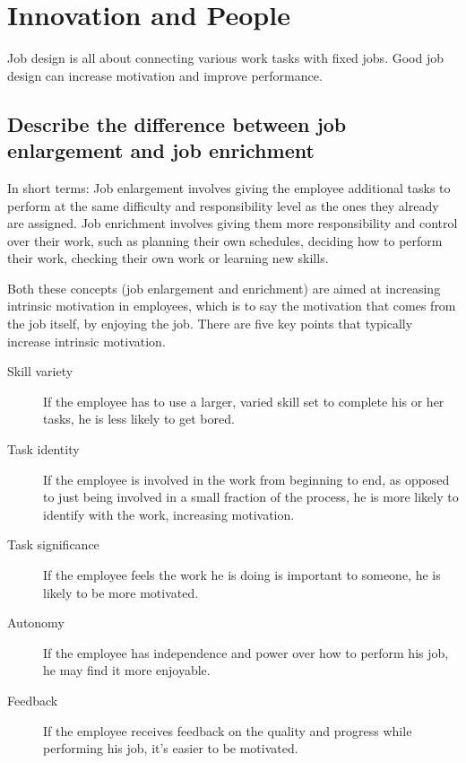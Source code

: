 \documentclass[a4paper]{article}
\begin{document}
    \section{Innovation and People} %
    Job design is all about connecting various work tasks with fixed jobs.
    Good job design can increase motivation and improve performance.

    \subsection*{Describe the difference between job enlargement and job
    enrichment}

    In short terms: Job enlargement involves giving the employee additional
    tasks to perform at the same difficulty and responsibility level as the
    ones they already are assigned. Job enrichment involves giving them more
    responsibility and control over their work, such as planning their own
    schedules, deciding how to perform their work, checking their own work or
    learning new skills.

    Both these concepts (job enlargement and enrichment) are aimed at
    increasing intrinsic motivation in employees, which is to say the
    motivation that comes from the job itself, by enjoying the job. There are
    five key points that typically increase intrinsic motivation.


    \begin{description}
        \item[Skill variety] If the employee has to use a larger, varied skill
        set to complete his or her tasks, he is less likely to get bored.

        \item[Task identity] If the employee is involved in the work from
        beginning to end, as opposed to just being involved in a small
        fraction of the process, he is more likely to identify with the work,
        increasing motivation.

        \item[Task significance] If the employee feels the work he is doing is
        important to someone, he is likely to be more motivated.

        \item[Autonomy] If the employee has independence and power over how to
        perform his job, he may find it more enjoyable.

        \item[Feedback] If the employee receives feedback on the quality and
        progress while performing his job, it's easier to be motivated.
    \end{description}
\end{document}
